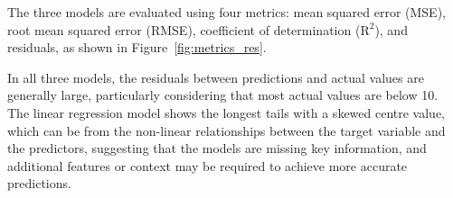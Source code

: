 \documentclass[9pt,twocolumn,twoside]{pnas-new}
\begin{document}
\begin{table}[ht]
\centering
\caption{The grid scan for XGBoost and Random Forest}
\label{tab:grid_scan}
\end{table}

The three models are evaluated using four metrics: mean squared error (MSE), root mean squared error (RMSE), coefficient of determination ($\text{R}^2$), and residuals, as shown in Figure~\ref{fig:metrics_res}. 

In all three models, the residuals between predictions and actual values are generally large, particularly considering that most actual values are below 10. The linear regression model shows the longest tails with a skewed centre value, which can be from the non-linear relationships between the target variable and the predictors, suggesting that the models are missing key information, and additional features or context may be required to achieve more accurate predictions.
\end{document}
